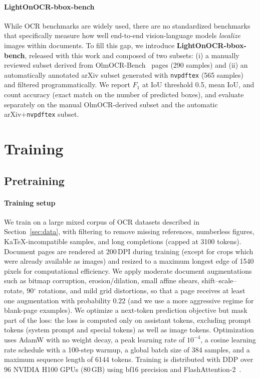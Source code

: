 \documentclass{article}
\begin{document}
\paragraph{LightOnOCR-bbox-bench}
While OCR benchmarks are widely used, there are no standardized benchmarks that specifically measure how well end-to-end vision-language models \emph{localize} images within documents. To fill this gap, we introduce \textbf{LightOnOCR-bbox-bench}, released with this work and composed of two subsets: (i) a manually reviewed subset derived from OlmOCR-Bench~\cite{poznanski2025olmocr} pages (290 samples) and (ii) an automatically annotated arXiv subset generated with \texttt{nvpdftex} (565 samples) and filtered programmatically. We report $F_1$ at IoU threshold 0.5, mean IoU, and count accuracy (exact match on the number of predicted boxes), and evaluate separately on the manual OlmOCR-derived subset and the automatic arXiv+\texttt{nvpdftex} subset.


\section{Training}
\subsection{Pretraining}
\paragraph{Training setup}
We train on a large mixed corpus of OCR datasets described in  Section~\ref{sec:data}, with filtering to remove missing references, numberless figures, KaTeX-incompatible samples, and long completions (capped at 3100 tokens). Document pages are rendered at 200\,DPI during training (except for crops which were already available as images) and resized to a maximum longest edge of 1540 pixels for computational efficiency. We apply moderate document augmentations such as bitmap corruption, erosion/dilation, small affine shears, shift--scale--rotate, 90$^\circ$ rotations, and mild grid distortions, so that a page receives at least one augmentation with probability $0.22$ (and we use a more aggressive regime for blank-page examples). We optimize a next-token prediction objective but mask part of the loss: the loss is computed only on assistant tokens, excluding prompt tokens (system prompt and special tokens) as well as image tokens. Optimization uses AdamW with no weight decay, a peak learning rate of $10^{-4}$, a cosine learning rate schedule with a 100-step warmup, a global batch size of 384 samples, and a maximum sequence length of 6144 tokens. Training is distributed with DDP over $96$ NVIDIA H100 GPUs (80\,GB) using bf16 precision and FlashAttention-2~\cite{dao2023flashattention2fasterattentionbetter}.
\end{document}
